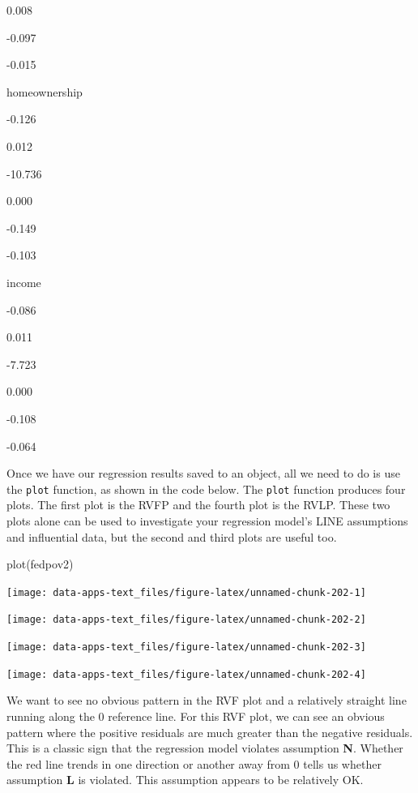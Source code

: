 \documentclass[
]{book}
\makeatletter
\newenvironment{Shaded}{\begin{snugshade}}{\end{snugshade}}
\newcommand{\FunctionTok}[1]{\textcolor[rgb]{0,0,0}{#1}}
\newcommand{\NormalTok}[1]{#1}
\newenvironment{kframe}{%
\medskip{}
\setlength{\fboxsep}{.8em}
 \def\at@end@of@kframe{}%
 \ifinner\ifhmode%
  \def\at@end@of@kframe{\end{minipage}}%
  \begin{minipage}{\columnwidth}%
 \fi\fi%
 \def\FrameCommand##1{\hskip\@totalleftmargin \hskip-\fboxsep
 \colorbox{shadecolor}{##1}\hskip-\fboxsep
     \hskip-\linewidth \hskip-\@totalleftmargin \hskip\columnwidth}%
 \MakeFramed {\advance\hsize-\width
   \@totalleftmargin\z@ \linewidth\hsize
   \@setminipage}}%
 {\par\unskip\endMakeFramed%
 \at@end@of@kframe}
\renewenvironment{Shaded}{\begin{kframe}}{\end{kframe}}
\makeatother
\begin{document}
0.008

-0.097

-0.015

homeownership

-0.126

0.012

-10.736

0.000

-0.149

-0.103

income

-0.086

0.011

-7.723

0.000

-0.108

-0.064

Once we have our regression results saved to an object, all we need to do is use the \texttt{plot} function, as shown in the code below. The \texttt{plot} function produces four plots. The first plot is the RVFP and the fourth plot is the RVLP. These two plots alone can be used to investigate your regression model's LINE assumptions and influential data, but the second and third plots are useful too.

\begin{Shaded}
\begin{Highlighting}[]
\FunctionTok{plot}\NormalTok{(fedpov2)}
\end{Highlighting}
\end{Shaded}

\begin{center}\texttt{[image: data-apps-text\_files/figure-latex/unnamed-chunk-202-1]} \end{center}

\begin{center}\texttt{[image: data-apps-text\_files/figure-latex/unnamed-chunk-202-2]} \end{center}

\begin{center}\texttt{[image: data-apps-text\_files/figure-latex/unnamed-chunk-202-3]} \end{center}

\begin{center}\texttt{[image: data-apps-text\_files/figure-latex/unnamed-chunk-202-4]} \end{center}

We want to see no obvious pattern in the RVF plot and a relatively straight line running along the 0 reference line. For this RVF plot, we can see an obvious pattern where the positive residuals are much greater than the negative residuals. This is a classic sign that the regression model violates assumption \textbf{N}. Whether the red line trends in one direction or another away from 0 tells us whether assumption \textbf{L} is violated. This assumption appears to be relatively OK.
\end{document}
